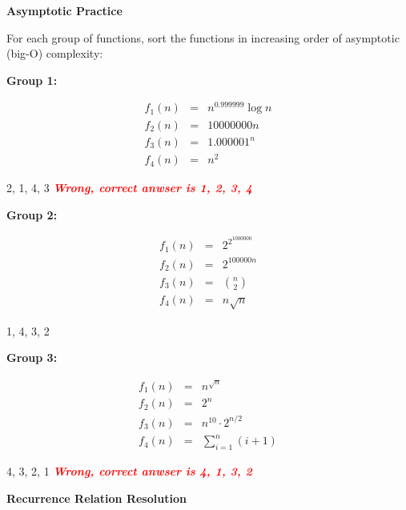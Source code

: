 \documentclass[12pt,twoside]{article}
\begin{document}
\begin{problems}

\problem {} \textbf{Asymptotic Practice}

For each group of functions, sort the functions in increasing order of
asymptotic (big-O) complexity:

\begin{problemparts}

\problempart {} \textbf{Group 1:}

$$
\begin{array}{rcl}
f_1(n) &=& n^{0.999999} \log n \\
f_2(n) &=& 10000000 n \\
f_3(n) &=& 1.000001^n \\
f_4(n) &=& n^2
\end{array}
$$

\ifsolution \solution{}
2, 1,  4, 3  \textcolor{red}{\textit{ \textbf{  Wrong, correct anwser is  1, 2, 3, 4}}}
\fi

\problempart {} \textbf{Group 2:}

$$
\begin{array}{rcl}
f_1(n) &=& 2^{2^{1000000}} \\
f_2(n) &=& 2^{100000n} \\
f_3(n) &=& \displaystyle \binom{n}{2} \\
f_4(n) &=& n \sqrt{n}
\end{array}
$$

\ifsolution \solution{}
1, 4, 3, 2 
\fi

\problempart {} \textbf{Group 3:}

$$
\begin{array}{rcl}
f_1(n) &=& n^{\sqrt{n}} \\
f_2(n) &=& 2^n \\
f_3(n) &=& n^{10} \cdot 2^{n / 2} \\
f_4(n) &=& \displaystyle\sum_{i = 1}^{n} (i + 1)
\end{array}
$$

\ifsolution \solution{}
4, 3, 2, 1 \textcolor{red}{\textit{ \textbf{  Wrong, correct anwser is  4, 1,  3, 2   }}}
\fi

\end{problemparts}

\problem {} \textbf{Recurrence Relation Resolution}


\end{problems}
\end{document}
